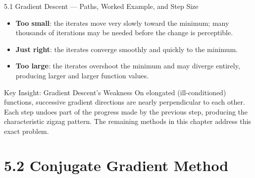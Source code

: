 \documentclass[aspectratio=169,10pt]{beamer}
\begin{document}
\begin{frame}[allowframebreaks]{5.1 Gradient Descent --- Paths, Worked Example, and Step Size}
  \begin{itemize}
    \item \textbf{Too small}: the iterates move very slowly
          toward the minimum; many thousands of iterations may
          be needed before the change is perceptible.
    \item \textbf{Just right}: the iterates converge smoothly
          and quickly to the minimum.
    \item \textbf{Too large}: the iterates overshoot the
          minimum and may diverge entirely, producing larger
          and larger function values.
  \end{itemize}

  \begin{alertblock}{Key Insight: Gradient Descent's Weakness}
    On elongated (ill-conditioned) functions, successive gradient
    directions are nearly perpendicular to each other.  Each step
    undoes part of the progress made by the previous step,
    producing the characteristic zigzag pattern.  The remaining
    methods in this chapter address this exact problem.
  \end{alertblock}

\end{frame}

\section{5.2 Conjugate Gradient Method}
\end{document}
